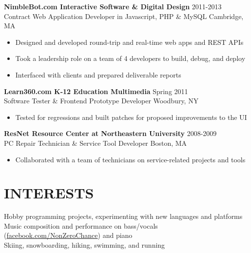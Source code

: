\documentclass[line,margin]{res}
\begin{document}
\begin{resume}
    {\large \textbf{NimbleBot.com Interactive Software \& Digital Design}}
    \hfill 2011-2013 \\
    Contract Web Application Developer in Javascript, PHP \& MySQL
    \hfill Cambridge, MA
    \begin{itemize}  \itemsep -2pt %
        \item Designed and developed round-trip and real-time web apps and REST APIs
        \item Took a leadership role on a team of 4 developers to build, debug, and deploy
        \item Interfaced with clients and prepared deliverable reports
    \end{itemize}

    {\large \textbf{Learn360.com K-12 Education Multimedia}}
    \hfill Spring 2011 \\
    Software Tester \& Frontend Prototype Developer
    \hfill Woodbury, NY
    \begin{itemize}  \itemsep -2pt %
        \item Tested for regressions and built patches for proposed improvements to the UI
    \end{itemize}

    {\large \textbf{ResNet Resource Center at Northeastern University}}
    \hfill 2008-2009 \\
    PC Repair Technician \& Service Tool Developer
    \hfill Boston, MA
    \begin{itemize}  \itemsep -2pt %
        \item Collaborated with a team of technicians on service-related projects and tools
    \end{itemize}

\section{INTERESTS}
    Hobby programming projects, experimenting with new languages and platforms \\
    Music composition and performance on bass/vocals (\href{https://www.facebook.com/NonZeroChance}{facebook.com/NonZeroChance}) and piano \\
    Skiing, snowboarding, hiking, swimming, and running

\end{resume}
\end{document}
